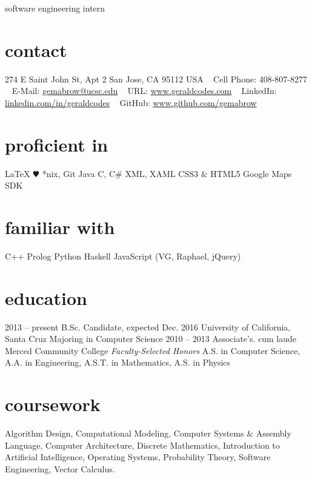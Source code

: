 \documentclass[]{./friggeri-cv}
\begin{document}
       {software engineering intern}

\begin{aside}
  \section{contact}
    274 E Saint John St,
    Apt 2
    San Jose, CA 95112
    USA 
    ~
    {Cell Phone: 408-807-8277} 
    ~ 
    E-Mail: \href{mailto:gemabrow@ucsc.edu}{gemabrow@ucsc.edu}
    ~
    URL: \href{http://www.geraldcodes.com}{www.geraldcodes.com}
    ~ 
    LinkedIn: \href{http://linkedin.com/in/geraldcodes}{\hspace{-3em}linkedin.com/in/geraldcodes}
    ~
    GitHub: \href{http://www.github.com/gemabrow}{\hspace{-3em}www.github.com/gemabrow}
  \section{proficient in}
    \LaTeX
   {\color{red} $\varheartsuit$} %
    *nix, Git
    Java
    C, C\#
    XML, XAML
    CSS3 \& HTML5
    Google Maps SDK
 \section{familiar with}
    C++
    Prolog
    Python
    Haskell
    JavaScript
    (VG, Raphael, jQuery)
\end{aside}
\section{education}
\begin{entrylist}
  \entry
    {2013 -- present}
    {B.Sc. {\normalfont Candidate, expected Dec. 2016}}
    {University of California, Santa Cruz}
    {Majoring in Computer Science}
  \entry
    {2010 -- 2013}
    {Associate's. cum laude}
    {Merced Community College}
    {\emph{Faculty-Selected Honors} A.S. in Computer Science,
    \\A.A. in Engineering, A.S.T. in Mathematics, A.S. in Physics}
\end{entrylist}
\section{coursework}
Algorithm Design, %
Computational Modeling, %
Computer Systems \& Assembly Language, %
Computer Architecture, %
Discrete Mathematics, %
Introduction to Artificial Intelligence, %
Operating Systems, %
Probability Theory, %
Software Engineering, %
Vector Calculus. %
\end{document}
